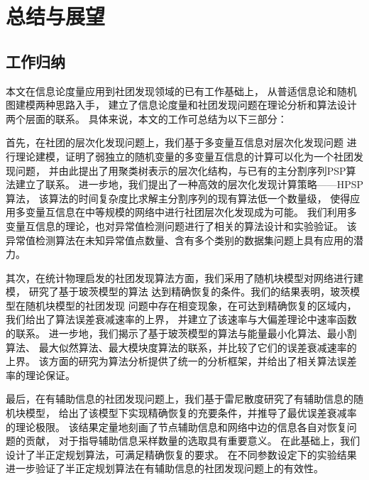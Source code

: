 \chapter{总结与展望}\label{chp:summary}
\section{工作归纳}
本文在信息论度量应用到社团发现领域的已有工作基础上，
从普适信息论和随机图建模两种思路入手，
建立了信息论度量和社团发现问题在理论分析和算法设计两个层面的联系。
具体来说，本文的工作可总结为以下三部分：

首先，在社团的层次化发现问题上，我们基于多变量互信息对层次化发现问题
进行理论建模，证明了弱独立的随机变量的多变量互信息的计算可以化为一个社团发现问题，
并由此提出了用聚类树表示的层次化结构，与已有的主分割序列PSP算法建立了联系。
进一步地，我们提出了一种高效的层次化发现计算策略——HPSP算法，
该算法的时间复杂度比求解主分割序列的现有算法低一个数量级，
使得应用多变量互信息在中等规模的网络中进行社团层次化发现成为可能。
我们利用多变量互信息的理论，也对异常值检测问题进行了相关的算法设计和实验验证。
该异常值检测算法在未知异常值点数量、含有多个类别的数据集问题上具有应用的潜力。

其次，在统计物理启发的社团发现算法方面，我们采用了随机块模型对网络进行建模，
研究了基于玻茨模型的算法
达到精确恢复的条件。我们的结果表明，玻茨模型在随机块模型的社团发现
问题中存在相变现象，在可达到精确恢复的区域内，我们给出了算法误差衰减速率的上界，
并建立了该速率与大偏差理论中速率函数的联系。
进一步地，我们揭示了基于玻茨模型的算法与能量最小化算法、最小割算法、
最大似然算法、最大模块度算法的联系，并比较了它们的误差衰减速率的上界。
该方面的研究为算法分析提供了统一的分析框架，并给出了相关算法误差率的理论保证。

最后，在有辅助信息的社团发现问题上，我们基于雷尼散度研究了有辅助信息的随机块模型，
给出了该模型下实现精确恢复的充要条件，并推导了最优误差衰减率的理论极限。
该结果定量地刻画了节点辅助信息和网络中边的信息各自对恢复问题的贡献，
对于指导辅助信息采样数量的选取具有重要意义。
在此基础上，我们设计了半正定规划算法，可满足精确恢复的要求。
在不同参数设定下的实验结果进一步验证了半正定规划算法在有辅助信息的社团发现问题上的有效性。


